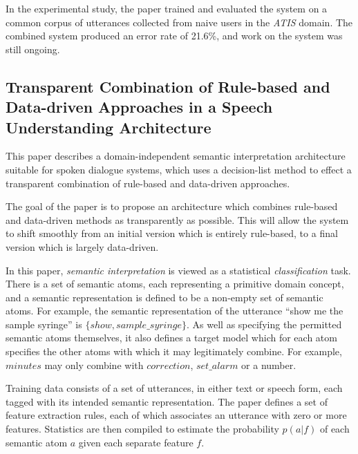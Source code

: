 \documentclass[paper=a4, fontsize=18pt]{article} %
\numberwithin{equation}{section} %
\numberwithin{figure}{section} %
\numberwithin{table}{section} %
\begin{document}
In the experimental study, the paper trained and evaluated the system on a common corpus of utterances collected from naive users in the \emph{ATIS} domain. The combined system produced an error rate of 21.6\%, and work on the system was still ongoing.


\subsection{Transparent Combination of Rule-based and Data-driven Approaches in a Speech Understanding Architecture \cite{Rayner2003}}

This paper describes a domain-independent semantic interpretation architecture suitable for spoken dialogue systems, which uses a decision-list method to effect a transparent combination of rule-based and data-driven approaches.

The goal of the paper is to propose an architecture which combines rule-based and data-driven methods as transparently as possible. This will allow the system to shift smoothly from an initial version which is entirely rule-based, to a final version which is largely data-driven.

In this paper, \emph{semantic interpretation} is viewed as a statistical \emph{classification} task. There is a set of semantic atoms, each representing a primitive domain concept, and a semantic representation is defined to be a non-empty set of semantic atoms. For example, the semantic representation of the utterance ``show me the sample syringe'' is $\{show, sample\_syringe\}$. As well as specifying the permitted semantic atoms themselves, it also defines a target model which for each atom specifies the other atoms with which it may legitimately combine. For example, $minutes$ may only combine with $correction$, $set\_alarm$ or a number.

Training data consists of a set of utterances, in either text or speech form, each tagged with its intended semantic representation. The paper defines a set of feature extraction rules, each of which associates an utterance with zero or more features. Statistics are then compiled to estimate the probability $p(a | f)$ of each semantic atom $a$ given each separate feature $f$.
\end{document}
